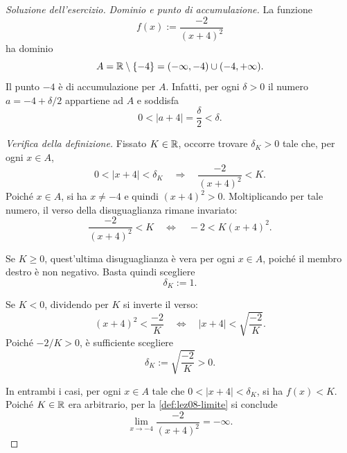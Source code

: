 \begin{proof}[Soluzione dell'esercizio]
\emph{Dominio e punto di accumulazione.}
La funzione
\[
  f(x):=\frac{-2}{(x+4)^2}
\]
ha dominio
\[
  A=\mathbb{R}\setminus\{-4\}
   =(-\infty,-4)\cup(-4,+\infty).
\]
Il punto \(-4\) è di accumulazione per \(A\). Infatti,
per ogni \(\delta>0\) il numero \(a=-4+\delta/2\)
appartiene ad \(A\) e soddisfa
\[
  0<|a+4|=\frac{\delta}{2}<\delta.
\]

\emph{Verifica della definizione.}
Fissato \(K\in\mathbb{R}\), occorre trovare
\(\delta_K>0\) tale che, per ogni \(x\in A\),
\[
  0<|x+4|<\delta_K
  \quad\Longrightarrow\quad
  \frac{-2}{(x+4)^2}<K.
\]
Poiché \(x\in A\), si ha \(x\ne-4\) e quindi
\((x+4)^2>0\). Moltiplicando per tale numero,
il verso della disuguaglianza rimane invariato:
\[
  \frac{-2}{(x+4)^2}<K
  \quad\Longleftrightarrow\quad
  -2<K(x+4)^2.
\]

Se \(K\ge0\), quest'ultima disuguaglianza è vera
per ogni \(x\in A\), poiché il membro destro è
non negativo. Basta quindi scegliere
\[
  \delta_K:=1.
\]

Se \(K<0\), dividendo per \(K\) si inverte il verso:
\[
  (x+4)^2<\frac{-2}{K}
  \quad\Longleftrightarrow\quad
  |x+4|<\sqrt{\frac{-2}{K}}.
\]
Poiché \(-2/K>0\), è sufficiente scegliere
\[
  \delta_K:=\sqrt{\frac{-2}{K}}>0.
\]

In entrambi i casi, per ogni \(x\in A\) tale che
\(0<|x+4|<\delta_K\), si ha \(f(x)<K\).
Poiché \(K\in\mathbb{R}\) era arbitrario, per la
\cref{def:lez08-limite} si conclude
\[
  \lim_{x\to-4}\frac{-2}{(x+4)^2}=-\infty.
\]
\end{proof}
